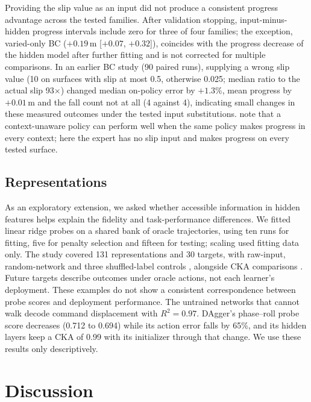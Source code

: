 \documentclass[conference]{IEEEtran}
\begin{document}
Providing the slip value as an input did not produce a consistent progress advantage across the tested families. After validation stopping, input-minus-hidden progress intervals include zero for three of four families; the exception, varied-only BC ($+0.19$\,m [$+0.07$, $+0.32$]), coincides with the progress decrease of the hidden model after further fitting and is not corrected for multiple comparisons. In an earlier BC study (90 paired runs), supplying a wrong slip value (10 on surfaces with slip at most 0.5, otherwise 0.025; median ratio to the actual slip 93$\times$) changed median on-policy error by $+1.3$\%, mean progress by $+0.01$\,m and the fall count not at all (4 against 4), indicating small changes in these measured outcomes under the tested input substitutions. \citet{beukman2023} note that a context-unaware policy can perform well when the same policy makes progress in every context; here the expert has no slip input and makes progress on every tested surface.

\subsection{Representations}
As an exploratory extension, we asked whether accessible information in hidden features helps explain the fidelity and task-performance differences. We fitted linear ridge probes \citep{alain2016} on a shared bank of oracle trajectories, using ten runs for fitting, five for penalty selection and fifteen for testing; scaling used fitting data only. The study covered 131 representations and 30 targets, with raw-input, random-network and three shuffled-label controls \citep{hewitt2019}, alongside CKA comparisons \citep{kornblith2019}. Future targets describe outcomes under oracle actions, not each learner's deployment. These examples do not show a consistent correspondence between probe scores and deployment performance. The untrained networks that cannot walk decode command displacement with $R^2=0.97$. DAgger's phase--roll probe score decreases (0.712 to 0.694) while its action error falls by 65\%, and its hidden layers keep a CKA of 0.99 with its initializer through that change. We use these results only descriptively.

\section{Discussion}
\end{document}
